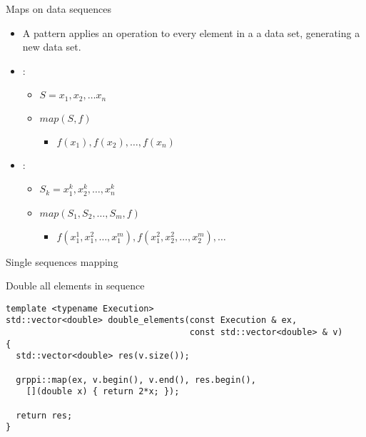 \begin{frame}[t]{Maps on data sequences}
\begin{itemize}
  \item A  pattern applies an operation to every element in a
        a data set, generating a new data set.
  \vfill
  \item {}:
    \begin{itemize}
      \item $S = x_1, x_2, \ldots x_n$
      \item $map(S,f)$
        \begin{itemize} 
          \item $f(x_1), f(x_2), \ldots, f(x_n)$
        \end{itemize}
    \end{itemize}

  \vfill
  \item {}:
    \begin{itemize}
      \item $S_k = x^k_1, x^k_2, \ldots, x^k_n$
      \item $map(S_1, S_2, \ldots, S_m, f)$
        \begin{itemize}
          \item $f(x^1_1, x^2_1, \ldots, x^m_1), f(x^2_1, x^2_2, \ldots, x^m_2), \ldots$
        \end{itemize}
    \end{itemize}
\end{itemize}
\end{frame}

\begin{frame}[t,fragile]{Single sequences mapping}
\begin{block}{Double all elements in sequence}
\begin{lstlisting}
template <typename Execution>
std::vector<double> double_elements(const Execution & ex, 
                                    const std::vector<double> & v) 
{
  std::vector<double> res(v.size());

  grppi::map(ex, v.begin(), v.end(), res.begin(), 
    [](double x) { return 2*x; });

  return res;
}
\end{lstlisting}
\end{block}
\end{frame}

